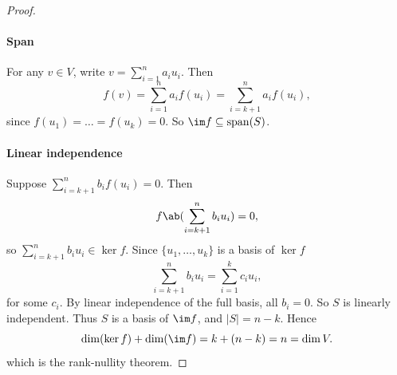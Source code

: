 \begin{solution}
\begin{enumext}
\begin{proof}
    \paragraph{Span}
    For any $v \in V$, write $v = \sum_{i=1}^n a_i u_i$. Then
    \[
      f(v) = \sum_{i=1}^n a_i f(u_i) = \sum_{i=k+1}^n a_i f(u_i),
    \]
    since $f(u_1) = \dots = f(u_k) = 0$. So $\im f \subseteq \operatorname{span}(S)$.
    \paragraph{Linear independence}
    Suppose $\sum_{i=k+1}^n b_i f(u_i) = 0$. Then
    \[
      f\ab(\sum_{i=k+1}^n b_i u_i) = 0,
    \]
    so $\sum_{i=k+1}^n b_i u_i \in \ker f$.  
    Since $\{u_1, \dots, u_k\}$ is a basis of $\ker f$
    \[
      \sum_{i=k+1}^n b_i u_i = \sum_{i=1}^k c_i u_i,
    \]
    for some $c_i$. By linear independence of the full basis, all $b_i = 0$.  
    So $S$ is linearly independent.
    Thus $S$ is a basis of $\im f$, and $|S| = n - k$.  
    Hence
    \[
      \dim(\ker f) + \dim(\im f) = k + (n - k) = n = \dim V.
    \]
    which is the rank-nullity theorem.
    \end{proof}
  \end{enumext}
\end{solution}

\newpage

